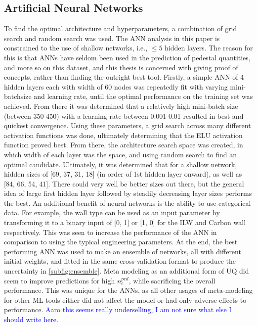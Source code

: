 \documentclass[a4paper, twoside, final, 12pt]{article}
\begin{document}
{\subsection{Artificial Neural Networks}
To find the optimal architecture and hyperparameters, a combination of grid search and random search was used.
The ANN analysis in this paper is constrained to the use of shallow networks, i.e., $\leq 5$ hidden layers.
The reason for this is that ANNs have seldom been used in the prediction of pedestal quantities, and more so on this dataset, and this thesis is concerned with giving proof of concepts, rather than finding the outright best tool.
Firstly, a simple ANN of 4 hidden layers each with width of 60 nodes was repeatedly fit with varying mini-batchsize and learning rate, until the optimal performance on the training set was achieved.
From there it was determined that a relatively high mini-batch size (between 350-450) with a learning rate between 0.001-0.01 resulted in best and quickest convergence.
Using these parameters, a grid search across many different activation functions was done, ultimately determining that the ELU activation function proved best.
From there, the architecture search space was created, in which width of each layer was the space, and using random search to find an optimal candidate.
Ultimately, it was determined that for a shallow network, hidden sizes of [69, 37, 31, 18] (in order of 1st hidden layer onward), as well as [84, 66, 54, 41].
There could very well be better sizes out there, but the general idea of large first hidden layer followed by steadily decreasing layer sizes performs the best.
An additional benefit of neural networks is the ability to use categorical data. 
For example, the wall type can be used as an input parameter by transforming it to a binary input of [0, 1] or [1, 0] for the ILW and Carbon wall respectively. 
This was seen to increase the performance of the ANN in comparison to using the typical engineering parameters.
At the end, the best performing ANN was used to make an ensemble of networks, all with different initial weights, and fitted in the same cross-validation format to produce the uncertainty in \ref{subfig:ensemble}.
Meta modeling as an additional form of UQ did seem to improve predictions for high $n_e^{ped}$, while sacrificing the overall performance.
This was unique for the ANNs, as all other usages of meta-modeling for other ML tools either did not affect the model or had only adverse effects to performance.
\textcolor{blue}{\@ Aaro this seems really underselling, I am not sure what else I should write here.}}
\end{document}
